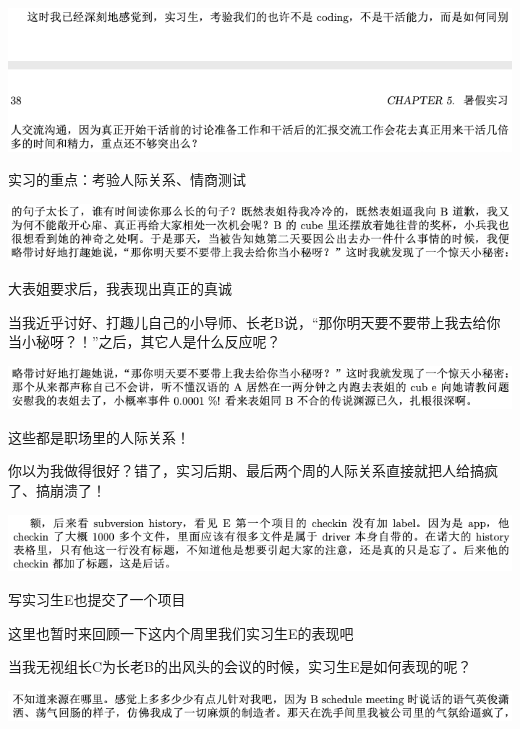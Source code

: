 \documentclass[9pt, b5paper]{article}
\begin{document}
\begin{center}
\includegraphics[width=.9\linewidth]{./pic/backups_plans_20210507_091150.png}
\end{center}

实习的重点：考验人际关系、情商测试

\begin{center}
\includegraphics[width=.9\linewidth]{./pic/backups_plans_20210507_093408.png}
\end{center}

大表姐要求后，我表现出真正的真诚

当我近乎讨好、打趣儿自己的小导师、长老B说，“那你明天要不要带上我去给你当小秘呀？！”之后，其它人是什么反应呢？

\begin{center}
\includegraphics[width=.9\linewidth]{./pic/backups_plans_20210507_093537.png}
\end{center}

这些都是职场里的人际关系！

你以为我做得很好？错了，实习后期、最后两个周的人际关系直接就把人给搞疯了、搞崩溃了！

\begin{center}
\includegraphics[width=.9\linewidth]{./pic/backups_plans_20210507_095519.png}
\end{center}

写实习生E也提交了一个项目 

这里也暂时来回顾一下这内个周里我们实习生E的表现吧

当我无视组长C为长老B的出风头的会议的时候，实习生E是如何表现的呢？

\begin{center}
\includegraphics[width=.9\linewidth]{./pic/backups_plans_20210507_095110.png}
\end{center}
\end{document}
